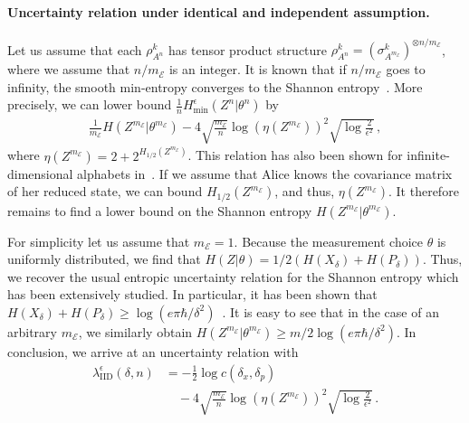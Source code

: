 \documentclass[aps,amsfonts,twoside,amssymb,superscriptaddress,twocolumn]{revtex4-1}
\newcommand*{\cE}{\mathcal{E}}
\newcommand*{\iid}{\textrm{IID}}
\begin{document}
\paragraph*{Uncertainty relation under identical and independent assumption.} 
Let us assume that each $\rho_{A^n}^k$ has tensor product structure $\rho_{A^n}^k= (\sigma_{A^{m_\cE}}^k )^{\otimes n/m_\cE}$, where we assume that $n/m_\cE$ is an integer. It is known that if $n/m_\cE$ goes to infinity, the smooth min-entropy converges to the Shannon entropy~\cite{renner05,tomamichel2009AEP}. More precisely, we can lower bound $\frac 1n H_{\min}^{\epsilon}(Z^n|\theta^n)$ by
\begin{align}
    \frac {1}{m_\cE} H(Z^{m_\cE}|\theta^{m_\cE}) - 4\sqrt{\frac{m_\cE}{n}} \log(\eta(Z^{m_\cE}))^2 \sqrt{\log\frac 2 {\epsilon^2}} \, , 
\end{align}
where  $\eta(Z^{m_\cE}) =  2+ 2^{H_{1/2}(Z^{m_\cE})}$. This relation has also been shown for infinite-dimensional alphabets in~\cite{Furrer10}. If we assume that Alice knows the covariance matrix of her reduced state, we can bound $H_{1/2}(Z^{m_\cE})$, and thus, $\eta(Z^{m_\cE})$. It therefore remains to find a lower bound on the Shannon entropy $H(Z^{m_\cE}|\theta^{m_\cE})$. 

For simplicity let us assume that $m_\cE=1$. Because the measurement choice $\theta$ is uniformly distributed, we find that $H(Z|\theta) = 1/2(H(X_\delta) + H(P_\delta) )$. Thus, we recover the usual entropic uncertainty relation for the Shannon entropy which has been extensively studied. In particular, it has been shown that $H(X_\delta) + H(P_\delta)\geq \log(e\pi\hbar/\delta^2 )$~\cite{Birula84}. It is easy to see that in the case of an arbitrary $m_\cE$, we similarly obtain $ H(Z^{m_\cE}|\theta^{m_\cE}) \geq m/2 \log(e\pi\hbar/\delta^2 )$. In conclusion, we arrive at an uncertainty relation with 
\begin{align}\label{URrateIID}
\lambda^\epsilon_\iid (\delta,n) &  = -\frac 12\log c(\delta_x,\delta_p)  \\
& \quad - 4\sqrt{\frac{m_\cE}{n}} \log(\eta(Z^{m_\cE}))^2 \sqrt{\log\frac 2 {\epsilon^2}} \, .
\end{align}
\end{document}
